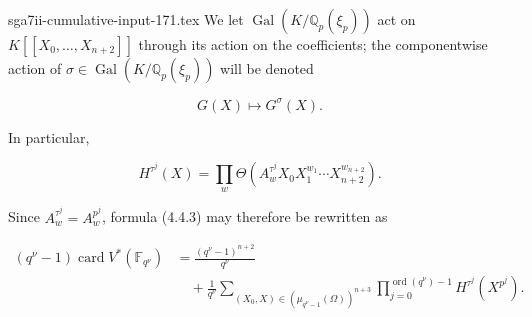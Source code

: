 \begin{filecontents*}{sga7ii-cumulative-input-171.tex}
We let $\operatorname{Gal}(K/\mathbb Q_p(\xi_p))$ act on
$K[[X_0,\ldots,X_{n+2}]]$ through its action on the coefficients; the
componentwise action of
$\sigma\in\operatorname{Gal}(K/\mathbb Q_p(\xi_p))$ will be denoted

\begin{equation}\tag{4.4.5}
G(X)\longmapsto G^\sigma(X).
\end{equation}

In particular,

\[
H^{\tau^j}(X)=\prod_w
\Theta\!\left(A_w^{\tau^j}X_0X_1^{w_1}\cdots
X_{n+2}^{w_{n+2}}\right).
\]

Since $A_w^{\tau^j}=A_w^{p^j}$, formula (4.4.3) may therefore be rewritten
as

\begin{equation}\tag{4.4.6}
\begin{aligned}
(q^\nu-1)\operatorname{card}V^*(\mathbb F_{q^\nu})
&=\frac{(q^\nu-1)^{n+2}}{q^\nu}\\
&\quad+\frac1{q^\nu}
\sum_{(X_0,X)\in(\mu_{q^\nu-1}(\Omega))^{n+3}}
\prod_{j=0}^{\operatorname{ord}(q^\nu)-1}H^{\tau^j}(X^{p^j}).
\end{aligned}
\end{equation}
\end{filecontents*}
